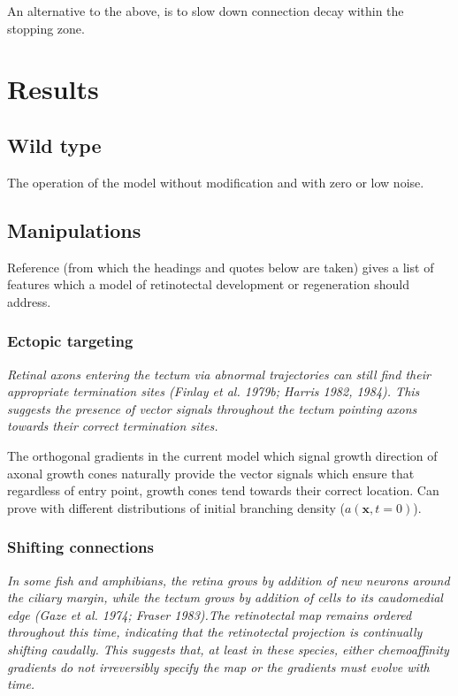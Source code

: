 \documentclass[11pt, a4paper]{article}
\newcommand{\mb}[1]{\mathbf{#1}} %
\begin{document}
An alternative to the above, is to slow down connection decay within the
stopping zone.

\section{Results}

\subsection{Wild type}

The operation of the model without modification and with zero or low noise.

\subsection{Manipulations}

Reference \cite{goodhill_development_2005} (from which the headings and quotes
below are taken) gives a list of features which a model of retinotectal
development or regeneration should address.

\subsubsection{Ectopic targeting}

\begin{displayquote}
\emph{Retinal axons entering the tectum via abnormal trajectories can still find
their appropriate termination sites (Finlay et al. 1979b; Harris 1982,
1984). This suggests the presence of vector signals throughout the tectum
pointing axons towards their correct termination sites.}
\end{displayquote}

The orthogonal gradients in the current model which signal growth direction of
axonal growth cones naturally provide the vector signals which ensure that
regardless of entry point, growth cones tend towards their correct
location. Can prove with different distributions of initial branching density
($a(\mb{x},t=0)$).

\subsubsection{Shifting connections}

\begin{displayquote}
\emph{In some fish and amphibians, the retina grows by addition of new neurons
around the ciliary margin, while the tectum grows by addition of cells to its
caudomedial edge (Gaze et al. 1974; Fraser 1983).The retinotectal map remains
ordered throughout this time, indicating that the retinotectal projection is
continually shifting caudally. This suggests that, at least in these species,
either chemoaffinity gradients do not irreversibly specify the map or the
gradients must evolve with time.}
\end{displayquote}
\end{document}
